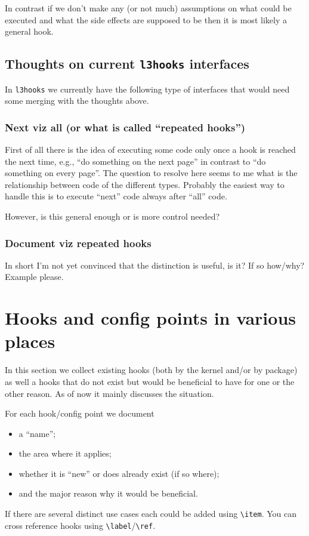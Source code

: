 \documentclass{article}
\newcounter{hook}
\newcounter{config}
\newcommand\cs[1]{\texttt{\textbackslash #1}}
\begin{document}
In contrast if we don't make any (or not much) assumptions on what
could be executed and what the side effects are supposed to be then it
is most likely a general hook.




\subsection{Thoughts on current \texttt{l3hooks} interfaces}

In \texttt{l3hooks} we currently have the following type of interfaces
that would need some merging with the thoughts above.

\subsubsection{Next viz all (or what is called \enquote{repeated hooks})}

First of all there is the idea of executing some code only once a hook
is reached the next time, e.g., \enquote{do something on the next
  page} in contrast to \enquote{do something on every page}. The
question to resolve here seems to me what is the relationship between
code of the different types. Probably the easiest way to handle this
is to execute \enquote{next} code always after \enquote{all} code.

However, is this general enough or is more control needed?


\subsubsection{Document viz repeated hooks}

In short I'm not yet convinced that the distinction is useful, is it?
If so how/why? Example please.




\section{Hooks and config points in various places}

In this section we collect existing \LaTeXe{} hooks (both by the
kernel and/or by package) as well a hooks that do not exist but would
be beneficial to have for one or the other reason. As of now it mainly
discusses the \LaTeXe{} situation.

For each hook/config point we document
\begin{itemize}
\item a ``name'';
\item the area where it applies;
\item whether it is ``new'' or does already exist (if so where);
\item and the major reason why it would be beneficial.
\end{itemize}
If there are several distinct use cases each could be added using
\cs{item}. You can cross reference hooks using
\cs{label}/\cs{ref}.
\end{document}
